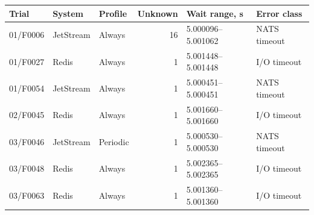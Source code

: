 \begin{tabular}{lllrll}
\toprule
Trial & System & Profile & Unknown & Wait range, s & Error class\\
\midrule
01/F0006 & JetStream & Always & 16 & 5.000096--5.001062 & NATS timeout\\
01/F0027 & Redis & Always & 1 & 5.001448--5.001448 & I/O timeout\\
01/F0054 & JetStream & Always & 1 & 5.000451--5.000451 & NATS timeout\\
02/F0045 & Redis & Always & 1 & 5.001660--5.001660 & I/O timeout\\
03/F0046 & JetStream & Periodic & 1 & 5.000530--5.000530 & NATS timeout\\
03/F0048 & Redis & Always & 1 & 5.002365--5.002365 & I/O timeout\\
03/F0063 & Redis & Always & 1 & 5.001360--5.001360 & I/O timeout\\
\bottomrule
\end{tabular}
